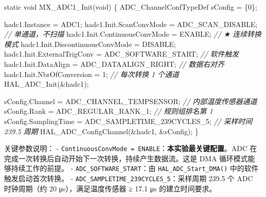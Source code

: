 \documentclass[
  chinese,
  UTF8,
  oneside,
  openany]{ctexbook}
\newenvironment{Shaded}{}{}
\newcommand{\CommentTok}[1]{\textcolor[rgb]{0.38,0.63,0.69}{\textit{#1}}}
\newcommand{\DataTypeTok}[1]{\textcolor[rgb]{0.56,0.13,0.00}{#1}}
\newcommand{\DecValTok}[1]{\textcolor[rgb]{0.25,0.63,0.44}{#1}}
\newcommand{\NormalTok}[1]{#1}
\newcommand{\OperatorTok}[1]{\textcolor[rgb]{0.40,0.40,0.40}{#1}}
\begin{document}
\begin{Shaded}
\begin{Highlighting}[]
\DataTypeTok{static} \DataTypeTok{void}\NormalTok{ MX\_ADC1\_Init}\OperatorTok{(}\DataTypeTok{void}\OperatorTok{)}
\OperatorTok{\{}
\NormalTok{    ADC\_ChannelConfTypeDef sConfig }\OperatorTok{=} \OperatorTok{\{}\DecValTok{0}\OperatorTok{\};}

\NormalTok{    hadc1}\OperatorTok{.}\NormalTok{Instance }\OperatorTok{=}\NormalTok{ ADC1}\OperatorTok{;}
\NormalTok{    hadc1}\OperatorTok{.}\NormalTok{Init}\OperatorTok{.}\NormalTok{ScanConvMode }\OperatorTok{=}\NormalTok{ ADC\_SCAN\_DISABLE}\OperatorTok{;}        \CommentTok{// 单通道，不扫描}
\NormalTok{    hadc1}\OperatorTok{.}\NormalTok{Init}\OperatorTok{.}\NormalTok{ContinuousConvMode }\OperatorTok{=}\NormalTok{ ENABLE}\OperatorTok{;}             \CommentTok{// ★ 连续转换模式}
\NormalTok{    hadc1}\OperatorTok{.}\NormalTok{Init}\OperatorTok{.}\NormalTok{DiscontinuousConvMode }\OperatorTok{=}\NormalTok{ DISABLE}\OperatorTok{;}
\NormalTok{    hadc1}\OperatorTok{.}\NormalTok{Init}\OperatorTok{.}\NormalTok{ExternalTrigConv }\OperatorTok{=}\NormalTok{ ADC\_SOFTWARE\_START}\OperatorTok{;}   \CommentTok{// 软件触发}
\NormalTok{    hadc1}\OperatorTok{.}\NormalTok{Init}\OperatorTok{.}\NormalTok{DataAlign }\OperatorTok{=}\NormalTok{ ADC\_DATAALIGN\_RIGHT}\OperatorTok{;}         \CommentTok{// 数据右对齐}
\NormalTok{    hadc1}\OperatorTok{.}\NormalTok{Init}\OperatorTok{.}\NormalTok{NbrOfConversion }\OperatorTok{=} \DecValTok{1}\OperatorTok{;}                     \CommentTok{// 每次转换 1 个通道}
\NormalTok{    HAL\_ADC\_Init}\OperatorTok{(\&}\NormalTok{hadc1}\OperatorTok{);}

\NormalTok{    sConfig}\OperatorTok{.}\NormalTok{Channel }\OperatorTok{=}\NormalTok{ ADC\_CHANNEL\_TEMPSENSOR}\OperatorTok{;}           \CommentTok{// 内部温度传感器通道}
\NormalTok{    sConfig}\OperatorTok{.}\NormalTok{Rank }\OperatorTok{=}\NormalTok{ ADC\_REGULAR\_RANK\_1}\OperatorTok{;}                  \CommentTok{// 规则组排名第 1}
\NormalTok{    sConfig}\OperatorTok{.}\NormalTok{SamplingTime }\OperatorTok{=}\NormalTok{ ADC\_SAMPLETIME\_239CYCLES\_5}\OperatorTok{;}  \CommentTok{// 采样时间 239.5 周期}
\NormalTok{    HAL\_ADC\_ConfigChannel}\OperatorTok{(\&}\NormalTok{hadc1}\OperatorTok{,} \OperatorTok{\&}\NormalTok{sConfig}\OperatorTok{);}
\OperatorTok{\}}
\end{Highlighting}
\end{Shaded}

关键参数说明： -
\texttt{ContinuousConvMode\ =\ ENABLE}：\textbf{本实验最关键配置}。ADC
在完成一次转换后自动开始下一次转换，持续产生数据流。这是 DMA
循环模式能够持续工作的前提。 - \texttt{ADC\_SOFTWARE\_START}：由
\texttt{HAL\_ADC\_Start\_DMA()} 中的软件触发启动首次转换。 -
\texttt{ADC\_SAMPLETIME\_239CYCLES\_5}：采样周期 239.5 个 ADC
时钟周期（约 20 μs），满足温度传感器 ≥ 17.1 μs 的建立时间要求。
\end{document}
